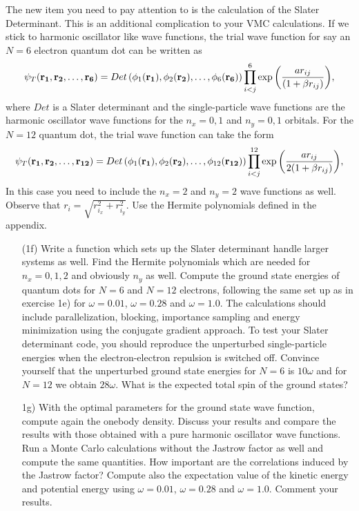 \begin{prob}
The new item you need to pay attention to is the calculation of the Slater Determinant. This is an additional complication
to your VMC calculations.
If we stick to harmonic oscillator like wave functions,
the trial wave function for say an $N=6$ electron quantum dot can be written as 
\begin{equation}
   \psi_{T}({\bf r_1},{\bf r_2},\dots, {\bf r_6}) = 
   Det\left(\phi_{1}({\bf r_1}),\phi_{2}({\bf r_2}),
   \dots,\phi_{6}({\bf r_6})\right)
   \prod_{i<j}^{6}\exp{\left(\frac{a r_{ij}}{(1+\beta r_{ij})}\right)}, 
\end{equation}
where $Det$ is a Slater determinant and the single-particle wave functions
are the harmonic oscillator wave functions for the $n_x=0,1$ and $n_y=0,1$ orbitals. 
For the $N=12$ quantum dot, the trial wave function can take the form
\begin{equation}
   \psi_{T}({\bf r_1},{\bf r_2}, \dots,{\bf r_{12}}) = 
   Det\left(\phi_{1}({\bf r_1}),\phi_{2}({\bf r_2}),
   \dots,\phi_{12}({\bf r_{12}})\right)
   \prod_{i<j}^{12}\exp{\left(\frac{ar_{ij}}{2(1+\beta r_{ij})}\right)}, 
\end{equation}
In this case you need to include the $n_x=2$ and $n_y=2$ wave functions as well.
Observe that $r_i = \sqrt{r_{i_x}^2+r_{i_y}^2}$.  Use the Hermite polynomials defined in the appendix.


\begin{enumerate}
\item[(1f)]   Write a function which sets up the Slater determinant 
handle larger systems as well. Find the Hermite polynomials which are needed for $n_x=0,1,2$ and obviously $n_y$ as well.
Compute the ground state energies of quantum dots for $N=6$ and $N=12$ electrons, following the same set up as in exercise 1e) for $\omega=0.01$,
$\omega=0.28$ and $\omega=1.0$.
The calculations should include  parallelization, blocking, importance sampling and energy minimization using the conjugate gradient approach.
To test your Slater determinant code, you should reproduce the unperturbed single-particle energies
when the electron-electron repulsion is switched off. Convince yourself that the unperturbed ground state energies for $N=6$ is $10\omega$ and for $N=12$ we obtain $28\omega$.  What is the expected total 
spin of the ground states?
  
\item[1g)]  With the optimal parameters for the ground state wave function, compute again the onebody density. Discuss your results and compare the results with those obtained with a pure harmonic oscillator  
wave functions. Run a Monte Carlo calculations without the Jastrow factor as well
and compute the same quantities. How important are the correlations induced by the Jastrow factor?
Compute also the expectation value of the kinetic energy and potential energy using $\omega=0.01$,
$\omega=0.28$ and $\omega=1.0$. Comment your results.
\end{enumerate}


\end{prob}
